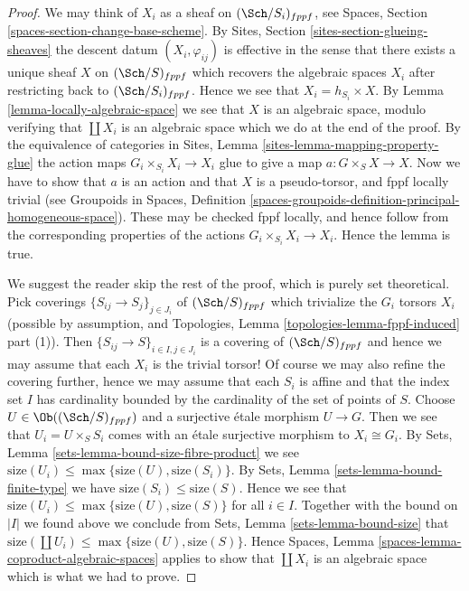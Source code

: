 \begin{proof}
We may think of $X_i$ as a sheaf on $(\Sch/S_i)_{fppf}$, see
Spaces, Section \ref{spaces-section-change-base-scheme}.
By
Sites, Section \ref{sites-section-glueing-sheaves}
the descent datum $(X_i, \varphi_{ij})$ is effective in the sense that
there exists a unique sheaf $X$ on $(\Sch/S)_{fppf}$ which
recovers the algebraic spaces $X_i$ after restricting back to
$(\Sch/S_i)_{fppf}$. Hence we see that
$X_i = h_{S_i} \times X$. By
Lemma \ref{lemma-locally-algebraic-space}
we see that $X$ is an algebraic space, modulo verifying that $\coprod X_i$
is an algebraic space which we do at the end of the proof.
By the equivalence of categories in
Sites, Lemma \ref{sites-lemma-mapping-property-glue}
the action maps $G_i \times_{S_i} X_i \to X_i$
glue to give a map $a : G \times_S X \to X$.
Now we have to show that $a$ is an action and that $X$
is a pseudo-torsor, and fppf locally trivial (see
Groupoids in Spaces,
Definition \ref{spaces-groupoids-definition-principal-homogeneous-space}).
These may be checked fppf locally, and
hence follow from the corresponding properties of the actions
$G_i \times_{S_i} X_i \to X_i$. Hence the lemma is true.

\medskip\noindent
We suggest the reader skip the rest of the proof, which is purely set
theoretical. Pick coverings $\{S_{ij} \to S_j\}_{j \in J_i}$ of
$(\Sch/S)_{fppf}$
which trivialize the $G_i$ torsors $X_i$ (possible by assumption, and
Topologies, Lemma \ref{topologies-lemma-fppf-induced} part (1)).
Then $\{S_{ij} \to S\}_{i \in I, j \in J_i}$ is a covering of
$(\Sch/S)_{fppf}$ and hence we may assume that each $X_i$
is the trivial torsor! Of course we may also refine the covering further,
hence we may assume that each $S_i$ is affine and that the index
set $I$ has cardinality bounded by the cardinality of the set of points
of $S$. Choose $U \in \Ob((\Sch/S)_{fppf})$ and a surjective
\'etale morphism $U \to G$. Then we see that $U_i = U \times_S S_i$ comes
with an \'etale surjective morphism to $X_i \cong G_i$. By
Sets, Lemma \ref{sets-lemma-bound-size-fibre-product}
we see $\text{size}(U_i) \leq \max\{\text{size}(U), \text{size}(S_i)\}$. By
Sets, Lemma \ref{sets-lemma-bound-finite-type}
we have $\text{size}(S_i) \leq \text{size}(S)$.
Hence we see that
$\text{size}(U_i) \leq \max\{\text{size}(U), \text{size}(S)\}$
for all $i \in I$. Together with the bound on $|I|$ we found above we
conclude from
Sets, Lemma \ref{sets-lemma-bound-size}
that $\text{size}(\coprod U_i) \leq \max\{\text{size}(U), \text{size}(S)\}$.
Hence
Spaces, Lemma \ref{spaces-lemma-coproduct-algebraic-spaces}
applies to show that $\coprod X_i$ is an algebraic space which is
what we had to prove.
\end{proof}




